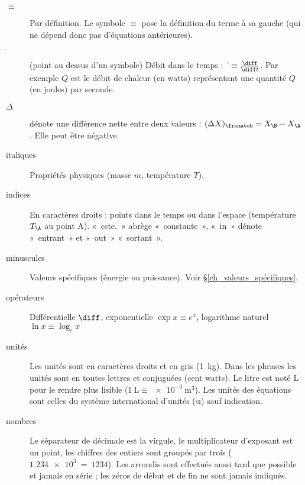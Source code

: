 
\TabPositions{2cm}
\begin{description}
	\item[$\equiv$] 	\tab Par définition. Le symbole $\equiv$ pose la définition du terme à sa gauche (qui ne dépend donc pas d’équations antérieures).
	\item[$\dot~$]		\tab (point au dessus d’un symbole) Débit dans le temps : $\dot~ \equiv \frac{\diff}{\diff t}$. Par exemple $\dot Q$ est le débit de chaleur (en \si{watts}) représentant une quantité $Q$ (en \si{joules}) par \si{seconde}.
	\item[$\Delta$]	\tab dénote une différence nette entre deux valeurs : $(\Delta X)_\fromatob = X_\B - X_\A$. Elle peut être négative.
	\item[italiques] 	Propriétés physiques (masse $m$, température $T$).
	\item[indices]		En caractères droits : points dans le temps ou dans l’espace (température $T_\A$ au point A). «~cste.~» abrège «~constante~», «~in~» dénote «~entrant~» et «~out~» «~sortant~».
	\item[minuscules]	Valeurs spécifiques (énergie ou puissance). Voir \S\ref{ch_valeurs_spécifiques}.
	\item[opérateurs]	Différentielle $\diff$, exponentielle $\exp x \equiv e^x $, logarithme naturel $\ln x \equiv \log_e x$
	\item[unités]		Les unités sont en caractères droits et en gris (\SI{1}{\kilogram}). Dans les phrases les unités sont en toutes lettres et conjuguées (cent \si{watts}). Le \si{litre} est noté \si{\liter} pour le rendre plus lisible ($\SI{1}{\liter} \equiv \SI{e-3}{\metre\cubed}$). Les unités des équations sont celles du système international d’unités (\textsc{si}) sauf indication.
	\item[nombres]		Le séparateur de décimale est la virgule, le multiplicateur d’exposant est un point, les chiffres des entiers sont groupés par trois ($\SI{1,234e3} ~=~ \num{1234}$). Les arrondis sont effectués aussi tard que possible et jamais en série ; les zéros de début et de fin ne sont jamais indiqués.
\end{description}
